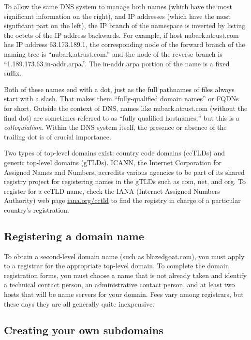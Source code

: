 To allow the same DNS system to manage both names (which have the most significant information on the right), and IP addresses (which have the
most significant part on the left), the IP branch of the namespace is
inverted by listing the octets of the IP address backwards. For example,
if host nubark.atrust.com has IP address 63.173.189.1, the corresponding
node of the forward branch of the naming tree is ``nubark.atrust.com.''
and the node of the reverse branch is ``1.189.173.63.in-addr.arpa.''.
The in-addr.arpa portion of the name is a fixed suffix.

Both of these names end with a dot, just as the full pathnames of files
always start with a slash. That makes them ``fully-qualified domain names'' or FQDNs for short.%
Outside the context of DNS, names like nubark.atrust.com (without the final dot) are sometimes referred to as ``fully qualified hostnames,'' but this is a \emph{colloquialism}.
Within the DNS system itself, the presence or absence of the trailing dot is of crucial importance.

Two types of top-level domains exist:
country code domains (ccTLDs) and generic top-level domains (gTLDs).
ICANN, the Internet Corporation for Assigned Names and Numbers,
accredits various agencies to be part of its shared registry project for registering names in the gTLDs such as com, net, and org.
To register for a ccTLD name, check the IANA
(Internet Assigned Numbers Authority) web page
{\href{http://iana.org/cctld}{iana.org/cctld}} to find the registry in charge of a particular country's registration.

\subsection{Registering a domain name}

To obtain a second-level domain name (such as blazedgoat.com), you must apply to a registrar for
the appropriate top-level domain.
To complete the domain registration forms, you must choose a name that is not already taken and identify a
technical contact person, an administrative contact person, and at least
two hosts that will be name servers for your domain. Fees vary among
registrars, but these days they are all generally quite inexpensive.


\subsection{Creating your own subdomains}

